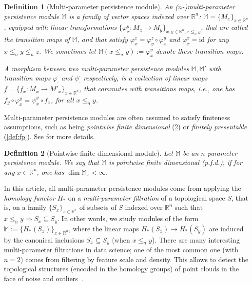 \documentclass{article}
\newcommand{\simpcomp}{S}
\newcommand{\R}{\mathbb{R}}
\newcommand{\Mbb}{\mathbb{M}}
\newcommand{\leqn}{\leq_n}
\newtheorem{definition}{Definition}%
\newcommand{\rebuttal}[1]{{ #1}}
\begin{document}
\begin{definition}[Multi-parameter persistence module]\label{def:multipers_module}
	An ($n$-)multi-parameter persistence module $\Mbb$ is a family of vector spaces indexed over $\R^n$: $\Mbb=\{M_x\}_{x\in\R^n}$,
	equipped with linear transformations $\{\varphi_x^y: M_x\rightarrow M_y\}_{
		x,y\in\R^n,x\leqn y
	}$, that are called the {\em transition maps} of $\Mbb$,
	and
	that satisfy
	$\varphi_x^z=\varphi_y^z\circ\varphi_x^y$ \rebuttal{and $\varphi^x_x = \mathrm{id}$} for any $x\leqn y\leqn z$. \rebuttal{We sometimes let $\Mbb(x\leqn y):=\varphi_x^y$ denote these transition maps.}


	A {\em morphism} between two multi-parameter persistence modules $\Mbb,\Mbb'$
	with transition maps $\varphi^\cdot_\cdot$ and $\psi^\cdot_\cdot$ respectively, is a collection of linear maps $f=\{f_x:M_x\rightarrow M'_x\}_{x\in\R^n}$,
	that commutes with transitions maps, i.e., one has
	$f_y\circ \varphi^y_x=\psi^y_x\circ f_x$, for all $x\leqn y$. \\
\end{definition}

\rebuttal{
	Multi-parameter persistence modules are often assumed to satisfy finiteness
	assumptions, such as being
	\emph{pointwise finite dimensional} (\cref{def:pfd}) or
	\emph{finitely presentable} (\cref{def:fp}).
	See \cite{botnanIntroductionMultiparameterPersistence2023} for more details. \\

	\begin{definition}[Pointwise finite dimensional module]\label{def:pfd}
		Let $\Mbb$ be an $n$-parameter persistence module.
		We say that
		$\Mbb$ is \emph{pointwise finite dimensional (p.f.d.)}, if for any $x\in \R^n$, one has $\dim \Mbb _x <\infty$. \\
	\end{definition}
}

In this article, all multi-parameter persistence modules come from applying the {\em homology functor} $H_*$ on
a {\em multi-parameter filtration} of a
\rebuttal{topological space}
$\simpcomp$, that is, on
a family $\{\simpcomp_x\}_{x\in\R^n}$ of subsets of $\simpcomp$ indexed over $\R^n$ such that $x\leqn y \Rightarrow \simpcomp_x\subseteq \simpcomp_y$.
In other words, we study modules of the form $\Mbb:=\{H_*(\simpcomp_x)\}_{x\in\R^n}$,
where the linear maps $H_*(\simpcomp_x)\to H_*(\simpcomp_y)$ are induced by the canonical inclusions $\simpcomp_x\subseteq \simpcomp_y$ (when $x\leqn y$).
There are many interesting multi-parameter filtrations in data science;  one of
the most common one (with $n=2$) comes from filtering by feature scale and
density.  This allows to detect the topological structures (encoded in the
homology groups) of point clouds in the face of noise and outliers~\cite{blumbergStability2parameterPersistent2021, carriereMultiparameterPersistenceImage2020}. \\
\end{document}

